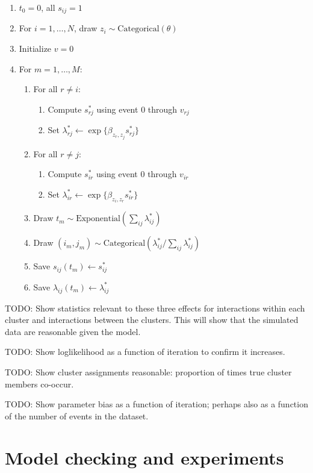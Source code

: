 \documentclass[11pt]{article}
\begin{document}
\begin{enumerate}
\item $t_0 = 0$, all $s_{ij} = 1$
\item For $i = 1, \ldots, N$, draw $z_i \sim \mbox{Categorical}(\theta)$
\item Initialize $v = 0$
\item For $m = 1, \ldots, M$:
  \begin{enumerate}
  \item For all $r \ne i$:
    \begin{enumerate}
    \item Compute $s_{rj}^*$ using event $0$ through $v_{rj}$
    \item Set $\lambda_{rj}^* \leftarrow \exp\{ \beta_{z_r,z_j} s_{rj}^*\}$ 
    \end{enumerate}
  \item For all $r \ne j$:
    \begin{enumerate}
    \item Compute $s_{ir}^*$ using event $0$ through $v_{ir}$
    \item Set $\lambda_{ir}^* \leftarrow \exp\{ \beta_{z_i,z_r} s_{ir}^*\}$ 
    \end{enumerate}    
  \item Draw $t_m \sim \mbox{Exponential}\left(\sum_{ij} \lambda_{ij}^*\right)$
  \item Draw $(i_m,j_m) \sim \mbox{Categorical}\left(\lambda_{ij}^* / \sum_{ij}\lambda_{ij}^*\right)$
  \item Save $s_{ij}(t_m) \leftarrow s_{ij}^*$
  \item Save $\lambda_{ij}(t_m) \leftarrow \lambda_{ij}^*$
  \end{enumerate}
\end{enumerate}

TODO: Show statistics relevant to these three effects for interactions within each cluster and interactions between the clusters.  This will show that the simulated data are reasonable given the model.

TODO: Show loglikelihood as a function of iteration to confirm it increases.

TODO: Show cluster assignments reasonable: proportion of times true cluster members co-occur.

TODO: Show parameter bias as a function of iteration; perhaps also as a function of the number of events in the dataset.

\section{Model checking and experiments}
\end{document}
